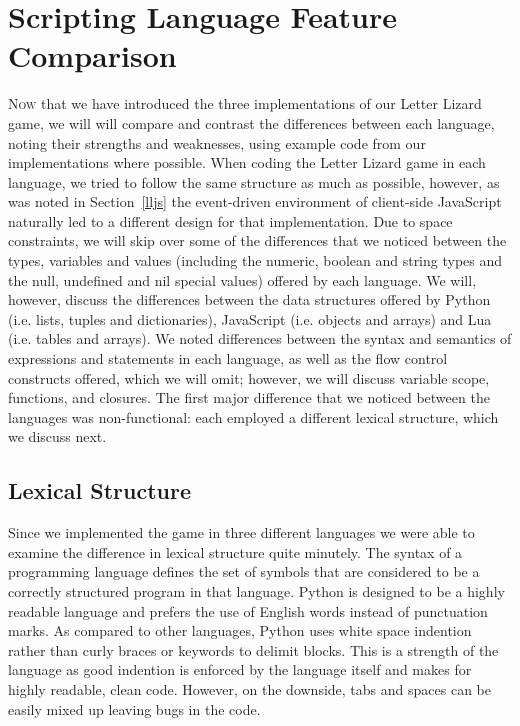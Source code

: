 \section{Scripting Language Feature Comparison}
\label{comparison}

\lettrine[nindent=0em,lines=3]{N}{ow} that we have introduced the three implementations of
our Letter Lizard game, we will will compare and contrast the differences between
each language, noting their strengths and weaknesses, using example code from our
implementations where possible. When coding the Letter Lizard game in each language,
we tried to follow the same structure as much as possible, however, as was noted in Section~\ref{lljs}
the event-driven environment of client-side JavaScript naturally led to a different
design for that implementation. Due to space constraints, we will skip over some of
the differences that we noticed between the types, variables and values (including 
the numeric, boolean and string types and the null, undefined and nil special values)
offered by each language.
We will, however, discuss the differences between the data structures offered by
Python (i.e. lists, tuples and dictionaries), JavaScript (i.e. objects and arrays)
and Lua (i.e. tables and arrays). We noted differences between the syntax and semantics
of expressions and statements in each language, as well as the flow
control constructs offered, which we will omit; however, we will discuss
variable scope, functions, and closures. The first major difference that we
noticed between the languages was non-functional: each employed a different lexical
structure, which we discuss next.

\subsection{Lexical Structure}
\label{lexstruct}

Since we implemented the game in three different languages we were able to examine the difference in lexical structure quite minutely. The syntax of a programming language defines the set of symbols that are considered to be a correctly structured program in that language. Python is designed to be a highly readable language and prefers the use of English words instead of punctuation marks. As compared to other languages, Python uses white space indention rather than curly braces or keywords to delimit blocks. This is a strength of the language as good indention is enforced by the language itself and makes for highly readable, clean code. However, on the downside, tabs and spaces can be easily mixed up leaving bugs in the code. 

